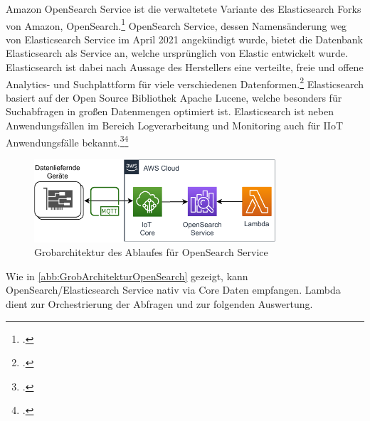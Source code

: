 Amazon OpenSearch Service ist die verwaltetete Variante des Elasticsearch Forks von Amazon, OpenSearch.\footcite[Vgl. auch im Folgenden][]{Meadows.2021} OpenSearch Service, dessen Namensänderung weg von Elasticsearch Service im April 2021 angekündigt wurde, bietet die Datenbank Elasticsearch als Service an, welche ursprünglich von Elastic entwickelt wurde. Elasticsearch ist dabei nach Aussage des Herstellers eine verteilte, freie und offene Analytics- und Suchplattform für viele verschiedenen Datenformen.\footcite[Vgl.][]{ElasticsearchInc..o.J.} Elasticsearch basiert auf der Open Source Bibliothek Apache Lucene, welche besonders für Suchabfragen in großen Datenmengen optimiert ist. Elasticsearch ist neben Anwendungsfällen im Bereich Logverarbeitung und Monitoring auch für \ac{IIoT} Anwendungsfälle bekannt.\footcite[Vgl.][]{Mantfeld.2019}\nzitat\footcite[Vgl.][]{Bajer.2017}

\begin{figure}[H]
\centering
\includegraphics[width=0.8\textwidth]{graphics/OpenSearch-general.pdf}
\caption{Grobarchitektur des Ablaufes für OpenSearch Service}
\label{abb:GrobArchitekturOpenSearch}
\end{figure}
Wie in \autoref{abb:GrobArchitekturOpenSearch} gezeigt, kann OpenSearch/Elasticsearch Service nativ via \AWSIOT{} Core Daten empfangen. Lambda dient zur Orchestrierung der Abfragen und zur folgenden Auswertung.


